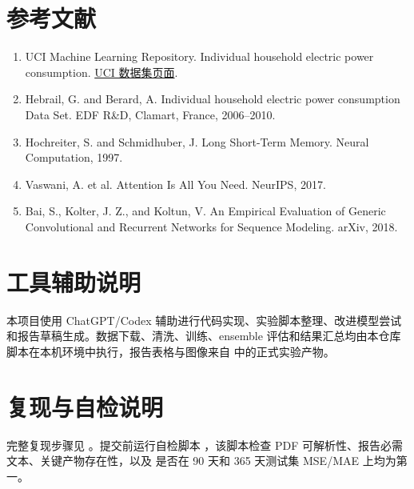 \documentclass[11pt,a4paper]{article}
\begin{document}
\section*{参考文献}
\begin{enumerate}[leftmargin=1.4em]
  \item UCI Machine Learning Repository. Individual household electric power consumption. \href{https://archive.ics.uci.edu/dataset/235/individual+household+electric+power+consumption}{UCI 数据集页面}.
  \item Hebrail, G. and Berard, A. Individual household electric power consumption Data Set. EDF R\&D, Clamart, France, 2006--2010.
  \item Hochreiter, S. and Schmidhuber, J. Long Short-Term Memory. Neural Computation, 1997.
  \item Vaswani, A. et al. Attention Is All You Need. NeurIPS, 2017.
  \item Bai, S., Kolter, J. Z., and Koltun, V. An Empirical Evaluation of Generic Convolutional and Recurrent Networks for Sequence Modeling. arXiv, 2018.
\end{enumerate}

\section*{工具辅助说明}

本项目使用 ChatGPT/Codex 辅助进行代码实现、实验脚本整理、改进模型尝试和报告草稿生成。数据下载、清洗、训练、ensemble 评估和结果汇总均由本仓库脚本在本机环境中执行，报告表格与图像来自  中的正式实验产物。

\section*{复现与自检说明}

完整复现步骤见 。提交前运行自检脚本 ，该脚本检查 PDF 可解析性、报告必需文本、关键产物存在性，以及  是否在 90 天和 365 天测试集 MSE/MAE 上均为第一。
\end{document}

